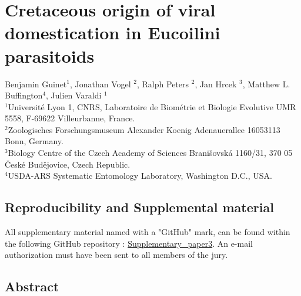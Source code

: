 \chapter{Cretaceous origin of viral domestication in Eucoilini parasitoids}
\label{chap:Papier3_datation}

\begin{center}
        \Large Benjamin Guinet$^{\text{1}}$, Jonathan Vogel $^{\text{2}}$, Ralph Peters  $^{\text{2}}$, Jan Hrcek $^{\text{3}}$, Matthew L. Buffington$^{\text{4}}$, Julien Varaldi $^{\text{1}}$\\
        \vspace{0.5cm}
        \normalsize
        $^{\text{1}}${Université Lyon 1, CNRS, Laboratoire de Biométrie et Biologie Evolutive UMR 5558, F-69622 Villeurbanne, France.}\\
        $^{\text{2}}${Zoologisches Forschungsmuseum Alexander Koenig Adenauerallee 16053113 Bonn, Germany.}\\
        $^{\text{3}}${Biology Centre of the Czech Academy of Sciences Branišovská 1160/31, 370 05 České Budějovice, Czech Republic.}\\
        $^{\text{4}}${USDA-ARS Systematic Entomology Laboratory, Washington D.C., USA.}\\
\end{center}
\setcounter{minitocdepth}{1}
{\hypersetup{linkcolor=GREYDARK}\minitoc}

\label{sec:chap3}
\newpage

\section{Reproducibility and Supplemental material}

All supplementary material named with a "GitHub" mark, can be found within the following GitHub repository : \href{https://github.com/BenjaminGuinet/PhD_defense/tree/main/Supplementary_paper3}{Supplementary\_paper3}. An e-mail authorization must have been sent to all members of the jury. 


\section{Abstract}
    
